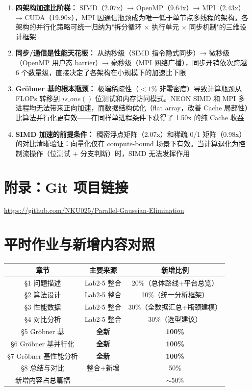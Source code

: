 \documentclass[a4paper]{article}
\begin{document}
\begin{enumerate}
    \item \textbf{四架构加速比阶梯：} SIMD（2.07x）→ OpenMP（9.64x）→ MPI（2.43x）→ CUDA（19.90x），MPI 因通信瓶颈成为唯一低于单节点多线程的架构。各架构的并行化策略可统一归纳为"拆分循环 $\times$ 执行单元 $\times$ 同步机制"的三维设计框架
    \item \textbf{同步/通信是性能天花板：} 从纳秒级（SIMD 指令隐式同步）→ 微秒级（OpenMP 用户态 barrier）→ 毫秒级（MPI 网络广播），同步开销依次跨越 6 个数量级，直接决定了各架构在小规模下的加速比下限
    \item \textbf{Gröbner 基的根本瓶颈：} 极端稀疏性（$<1\%$ 非零密度）导致计算瓶颈从 FLOPs 转移到 $is\_one()$ 位测试和内存访问模式。NEON SIMD 和 MPI 多进程均无法带来正向加速，而数据结构优化（flat array，改善 Cache 局部性）比算法并行化更有效——在同样单进程条件下获得了 1.50x 的纯 Cache 收益
    \item \textbf{SIMD 加速的前提条件：} 稠密浮点矩阵（2.07x）和稀疏 0/1 矩阵（0.98x）的对比清晰验证：向量化仅在 compute-bound 场景下有效。当计算退化为控制流操作（位测试 + 分支判断）时，SIMD 无法发挥作用
\end{enumerate}

\newpage
\section*{附录：Git 项目链接}
\url{https://github.com/NKU025/Parallel-Gaussian-Elimination}

\section*{平时作业与新增内容对照}
\begin{table}[H]
  \centering
  \begin{tabular}{|c|c|c|}
  \hline
  \textbf{章节} & \textbf{主要来源} & \textbf{新增比例} \\
  \hline
  §1 问题描述 & Lab2-5 整合 & 20\%（总体路线+平台总览） \\
  §2 算法设计 & Lab2-5 整合 & 10\%（统一分析框架） \\
  §3 性能数据 & Lab2-5 整合 & 30\%（全数据汇总+瓶颈建模） \\
  §4 对比分析 & Lab2-5 整合 & 30\%（选型建议） \\
  §5 Gröbner 基 & \textbf{全新} & \textbf{100\%} \\
  §6 Gröbner 基并行化 & \textbf{全新} & \textbf{100\%} \\
  §7 Gröbner 基性能分析 & \textbf{全新} & \textbf{100\%} \\
  §8 总结与对比 & 整合+新增 & 50\% \\
  \hline
  新增内容占总篇幅 & — & $\sim$50\% \\
  \hline
  \end{tabular}
\end{table}
\end{document}
